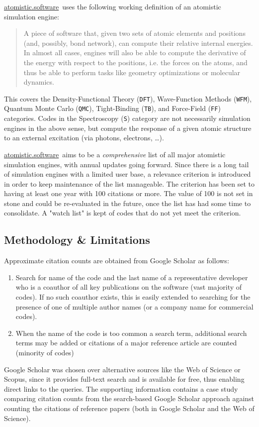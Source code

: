 \documentclass[9pt,review]{livecoms}
\newcommand{\atsoft}{\href{https://atomistic.software}{atomistic.software}\ }
\begin{document}
\atsoft uses the following working definition of an atomistic simulation engine:

\begin{quote}
A piece of software that, given two sets of atomic elements and positions (and, possibly, bond network), can compute their relative internal energies. 
In almost all cases, engines will also be able to compute the derivative of the energy with respect to the positions, i.e. the forces on the atoms, and thus be able to perform tasks like geometry optimizations or molecular dynamics.
\end{quote}

This covers the Density-Functional Theory (\verb|DFT|), Wave-Function Methods (\verb|WFM|), Quantum Monte Carlo (\verb|QMC|), Tight-Binding (\verb|TB|), and Force-Field (\verb|FF|) categories.
Codes in the Spectroscopy (\verb|S|) category are not necessarily simulation engines in the above sense, but compute the response of a given atomic structure to an external excitation (via photons, electrons, \ldots).

\atsoft aims to be a \emph{comprehensive} list of all major atomistic simulation engines, with annual updates going forward. 
Since there is a long tail of simulation engines with a limited user base, a relevance criterion is introduced in order to keep maintenance of the list manageable.
The criterion has been set to having at least one year with 100 citations or more.
The value of 100 is not set in stone and could be re-evaluated in the future, once the list has had some time to consolidate.
A "watch list" is kept of codes that do not yet meet the criterion.

\label{sec:methodology}
\subsection{Methodology \& Limitations}

Approximate citation counts are obtained from Google Scholar as follows:
\begin{enumerate}
    \item Search for name of the code and the last name of a representative developer who is a coauthor of all key publications on the software (vast majority of codes). 
        If no such coauthor exists, this is easily extended to searching for the presence of one of multiple author names (or a company name for commercial codes).
    \item When the name of the code is too common a search term, additional search terms may be added or citations of a major reference article are counted (minority of codes)
\end{enumerate}
Google Scholar was chosen over alternative sources like the Web of Science or Scopus, since it provides full-text search and is available for free, thus enabling direct links to the queries.
The supporting information contains a case study comparing citation counts from the search-based Google Scholar approach against counting the citations of reference papers (both in Google Scholar and the Web of Science).
\end{document}
